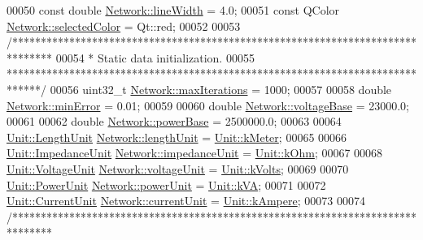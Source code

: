 \begin{DoxyCode}
00050 \textcolor{keyword}{const} \textcolor{keywordtype}{double} \hyperlink{group___graphics_ga3f810634c9908d62d33a1ab09a76c147}{Network::lineWidth} = 4.0;
00051 \textcolor{keyword}{const} QColor \hyperlink{group___graphics_gaa9e21b8e2a24b0495e776a51e1aeed94}{Network::selectedColor} = Qt::red;
00052 
00053 \textcolor{comment}{/*******************************************************************************}
00054 \textcolor{comment}{ * Static data initialization.}
00055 \textcolor{comment}{ ******************************************************************************/}
00056 uint32\_t \hyperlink{group___graphics_ga318dee060bc577eacd67d332efbbe1b2}{Network::maxIterations} = 1000;
00057 
00058 \textcolor{keywordtype}{double} \hyperlink{group___graphics_gabcdc973129d3dda7572b7a1c388da1b5}{Network::minError} = 0.01;
00059 
00060 \textcolor{keywordtype}{double} \hyperlink{group___graphics_ga7c1e79d9ac69df9a69f24eaf092fd5e5}{Network::voltageBase} = 23000.0;
00061 
00062 \textcolor{keywordtype}{double} \hyperlink{group___graphics_ga74bb7aa495d422f1f092acdf958df989}{Network::powerBase} = 2500000.0;
00063 
00064 \hyperlink{class_unit_a8c8921f7b225ad6063b1cb573425b9a0}{Unit::LengthUnit} \hyperlink{group___graphics_gae46c0e2bf39b343875e3c69066fe2652}{Network::lengthUnit} = 
      \hyperlink{class_unit_a8c8921f7b225ad6063b1cb573425b9a0abfa41ebe7ee649a1f02c9b8ae570434b}{Unit::kMeter};
00065 
00066 \hyperlink{class_unit_a3747e779c805df24a71961290be3fbdf}{Unit::ImpedanceUnit} \hyperlink{group___graphics_ga5f3d72699a723c64a89d22e34df708ff}{Network::impedanceUnit} = 
      \hyperlink{class_unit_a3747e779c805df24a71961290be3fbdfa6b9c74d1763eefbaf751eeecff0bd9da}{Unit::kOhm};
00067 
00068 \hyperlink{class_unit_a55b07dfa9457e1eca2c7194fe0cfc3c1}{Unit::VoltageUnit} \hyperlink{group___graphics_gacde031ef95f5c05565ee35769f2ed89e}{Network::voltageUnit} = 
      \hyperlink{class_unit_a55b07dfa9457e1eca2c7194fe0cfc3c1aa54b2473993a702a3923525765bd6e4c}{Unit::kVolts};
00069 
00070 \hyperlink{class_unit_ace265ae255370ccacfd5370337572c3b}{Unit::PowerUnit} \hyperlink{group___graphics_ga9504015bc566f4a3d3b4d4a86000293b}{Network::powerUnit} = \hyperlink{class_unit_ace265ae255370ccacfd5370337572c3ba72b181a842ae2759488a2fa1410d3696}{Unit::kVA};
00071 
00072 \hyperlink{class_unit_a0794cf6c9682f48296dd4a5315389787}{Unit::CurrentUnit} \hyperlink{group___graphics_gac6a26db5fef2b1dd2a00faf6340d1702}{Network::currentUnit} = 
      \hyperlink{class_unit_a0794cf6c9682f48296dd4a5315389787a368a3c470f0b590a6100dda717a7dd4f}{Unit::kAmpere};
00073 
00074 \textcolor{comment}{/*******************************************************************************}

\end{DoxyCode}
